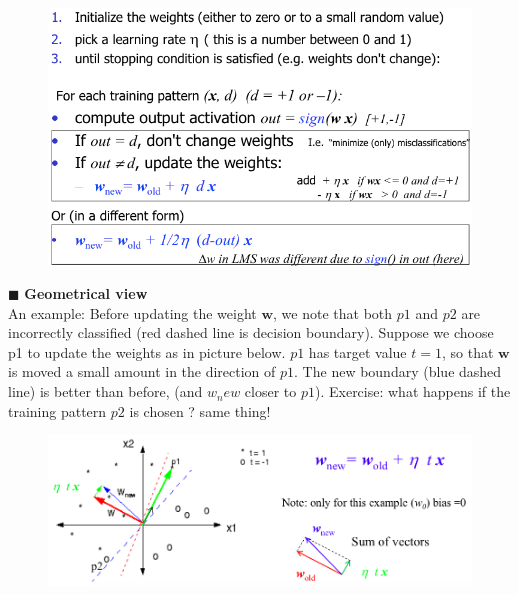 \documentclass[../main.tex]{subfiles}
\begin{document}
\begin{figure}[H]
    \centering
    \includegraphics[scale = 0.4]{lectures/4_neural_networks/4_PLA.png}
    \label{fig:pla}
\end{figure}

\noindent$\blacksquare$ \textbf{Geometrical view}\\
An example: Before updating the weight $\mathbf{w}$, we note that both $p1$ and $p2$ are incorrectly classified (red dashed line is decision boundary).
Suppose we choose p1 to update the weights as in picture below.
$p1$ has target value $t = 1$, so that $\mathbf{w}$ is moved a small amount in the direction of $p1$. The new boundary (blue dashed line) is better than before, (and $w_new$ closer to $p1$). Exercise: what happens if the training pattern $p2$ is chosen ? same thing!
\begin{figure}[H]
    \centering
    \includegraphics[scale = 0.35]{lectures/4_neural_networks/4_geometrical_view.png}
    \label{fig:geometrical_view}
\end{figure}
\end{document}
